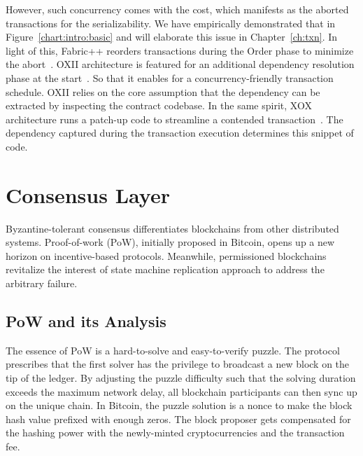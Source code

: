 However, such concurrency comes with the cost, which manifests as the aborted transactions for the serializability. 
We have empirically demonstrated that in Figure~\ref{chart:intro:basic} and will elaborate this issue in Chapter~\ref{ch:txn}. 
In light of this, Fabric++ reorders transactions during the Order phase to minimize the abort~\cite{sharma2019blurring}. 
OXII architecture is featured for an additional dependency resolution phase at the start~\cite{amiri2019parblockchain}.
So that it enables for a concurrency-friendly transaction schedule. 
OXII relies on the core assumption that the dependency can be extracted by inspecting the contract codebase. 
In the same spirit, XOX architecture runs a patch-up code to streamline a contended transaction~\cite{gorenflo2020xox}. 
The dependency captured during the transaction execution determines this snippet of code. 

\section{Consensus Layer}
Byzantine-tolerant consensus differentiates blockchains from other distributed systems. 
Proof-of-work (PoW), initially proposed in Bitcoin, opens up a new horizon on incentive-based protocols. 
Meanwhile, permissioned blockchains revitalize the interest of 
state machine replication approach to address the arbitrary failure. 

\subsection{PoW and its Analysis}
The essence of PoW is a hard-to-solve and easy-to-verify puzzle. 
The protocol prescribes that the first solver has the privilege to broadcast a new block on the tip of the ledger. 
By adjusting the puzzle difficulty such that the solving duration exceeds the maximum network delay,
all blockchain participants can then sync up on the unique chain. 
In Bitcoin, the puzzle solution is a nonce to make the block hash value prefixed with enough zeros. 
The block proposer gets compensated for the hashing power with the newly-minted cryptocurrencies and the transaction fee. 

